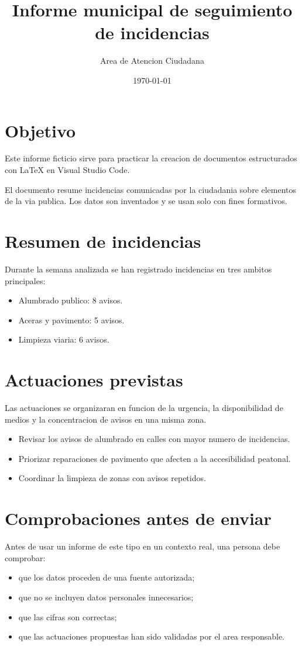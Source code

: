 \documentclass[a4paper,12pt]{article}
\title{Informe municipal de seguimiento de incidencias}
\author{Area de Atencion Ciudadana}
\date{\today}
\begin{document}
\maketitle

\section{Objetivo}

Este informe ficticio sirve para practicar la creacion de documentos estructurados con LaTeX en Visual Studio Code.

El documento resume incidencias comunicadas por la ciudadania sobre elementos de la via publica. Los datos son inventados y se usan solo con fines formativos.

\section{Resumen de incidencias}

Durante la semana analizada se han registrado incidencias en tres ambitos principales:

\begin{itemize}
    \item Alumbrado publico: 8 avisos.
    \item Aceras y pavimento: 5 avisos.
    \item Limpieza viaria: 6 avisos.
\end{itemize}

\section{Actuaciones previstas}

Las actuaciones se organizaran en funcion de la urgencia, la disponibilidad de medios y la concentracion de avisos en una misma zona.

\begin{itemize}
    \item Revisar los avisos de alumbrado en calles con mayor numero de incidencias.
    \item Priorizar reparaciones de pavimento que afecten a la accesibilidad peatonal.
    \item Coordinar la limpieza de zonas con avisos repetidos.
\end{itemize}

\section{Comprobaciones antes de enviar}

Antes de usar un informe de este tipo en un contexto real, una persona debe comprobar:

\begin{itemize}
    \item que los datos proceden de una fuente autorizada;
    \item que no se incluyen datos personales innecesarios;
    \item que las cifras son correctas;
    \item que las actuaciones propuestas han sido validadas por el area responsable.
\end{itemize}
\end{document}
